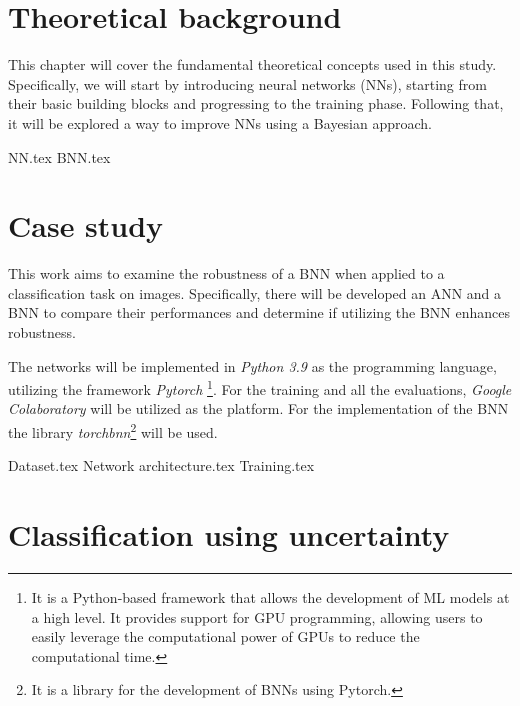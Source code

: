 \documentclass[
	12pt,
	a4paper,
	cleardoublepage=empty,
	headings=twolinechapter,
	numbers=autoenddot,
]{scrbook}
\begin{document}
	\chapter{Theoretical background}
	This chapter will cover the fundamental theoretical concepts used in this study. Specifically, we will start by introducing neural networks (NNs), starting from their basic building blocks and progressing to the training phase. Following that, it will be explored a way to improve NNs using a Bayesian approach.
	
	{NN.tex}
	{BNN.tex}
		
	\chapter{Case study}
	This work aims to examine the robustness of a BNN when applied to a classification task on images. Specifically, there will be developed an ANN and a BNN to compare their performances and determine if utilizing the BNN enhances robustness.
	
	The networks will be implemented in \textit{Python 3.9} as the programming language, utilizing the framework \textit{Pytorch} \footnote{It is a Python-based framework that allows the development of ML models at a high level. It provides support for GPU programming, allowing users to easily leverage the computational power of GPUs to reduce the computational time.}\cite{NEURIPS2019_9015}. 
	For the training and all the evaluations, \textit{Google Colaboratory} will be utilized as the platform. For the implementation of the BNN the library \textit{torchbnn}\footnote{It is a library for the development of BNNs using Pytorch.}\cite{Torchbnn} will be used.
	
	{Dataset.tex}
	{Network architecture.tex}
	{Training.tex}
	
	\chapter{Classification using uncertainty}\label{chap:c3}
	
\end{document}
